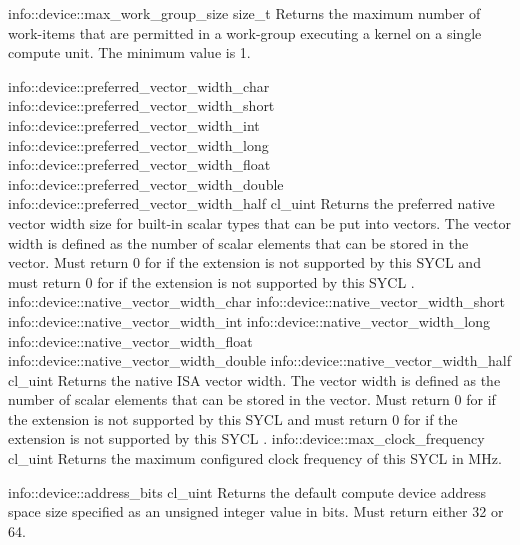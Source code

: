      \addInfoRow
       {info::device::max_work_group_size}
       {size_t }
       {
         Returns the maximum number of work-items that are permitted in a work-group executing a kernel on a single compute unit.
         The minimum value is 1.
       }

     \addInfoRow
       {
         info::device::preferred_vector_width_char
         info::device::preferred_vector_width_short
         info::device::preferred_vector_width_int
         info::device::preferred_vector_width_long
         info::device::preferred_vector_width_float
         info::device::preferred_vector_width_double
         info::device::preferred_vector_width_half
       }
       {cl_uint}
       {
         Returns the preferred native vector width size for built-in scalar types that can be put into vectors. The vector width is defined as the number of scalar elements that can be stored in the vector. Must return 0 for  if the  extension is not supported by this SYCL  and must return 0 for   if the  extension is not supported by this SYCL .
       }
     \addInfoRow
    {
         info::device::native_vector_width_char
         info::device::native_vector_width_short
         info::device::native_vector_width_int
         info::device::native_vector_width_long
         info::device::native_vector_width_float
         info::device::native_vector_width_double
         info::device::native_vector_width_half
       }
       {cl_uint}
       {
    Returns the native ISA vector width. The vector width is defined as the number of scalar elements that can be stored in the vector. Must return 0 for  if the  extension is not supported by this SYCL  and must return 0 for   if the  extension is not supported by this SYCL .
      }
   \addInfoRow
     {info::device::max_clock_frequency}
     {cl_uint}
     {
         Returns the maximum configured clock frequency of this SYCL  in MHz.
     }

   \addInfoRow
     {info::device::address_bits} {cl_uint}
     {
   Returns the default compute device address space size specified as an unsigned integer value in bits. Must return either 32 or 64.
     }

